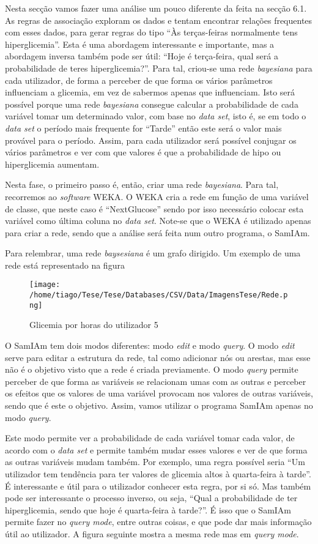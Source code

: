 Nesta secção vamos fazer uma análise um pouco diferente da feita na secção 6.1. As regras de associação exploram os dados e tentam encontrar relações frequentes com esses dados, para gerar regras do tipo ``Às terças-feiras normalmente tens hiperglicemia''. Esta é uma abordagem interessante e importante, mas a abordagem inversa também pode ser útil: ``Hoje é terça-feira, qual será a probabilidade de teres hiperglicemia?''. Para tal, criou-se uma rede \textit{bayesiana} para cada utilizador, de forma a perceber de que forma os vários parâmetros influenciam a glicemia, em vez de sabermos apenas que influenciam. Isto será possível porque uma rede \textit{bayesiana} consegue calcular a probabilidade de cada variável tomar um determinado valor, com base no \textit{data set}, isto é, se em todo o \textit{data set} o período mais frequente for ``Tarde'' então este será o valor mais provável para o período. 
Assim, para cada utilizador será possível conjugar os vários parâmetros e ver com que valores é que a probabilidade de hipo ou hiperglicemia aumentam.

Nesta fase, o primeiro passo é, então, criar uma rede \textit{bayesiana}. Para tal, recorremos ao \textit{software} WEKA. O WEKA cria a rede em função de uma variável de classe, que neste caso é ``Next\textunderscore Glucose'' sendo por isso necessário colocar esta variável como última coluna no \textit{data set}. Note-se que o WEKA é utilizado apenas para criar a rede, sendo que a análise será feita num outro programa, o SamIAm.

Para relembrar, uma rede \textit{baysesiana} é um grafo dirigido. Um exemplo de uma rede está representado na figura
\begin{figure}[H]
\centering
\texttt{[image: /home/tiago/Tese/Tese/Databases/CSV/Data/ImagensTese/Rede.png]}
\caption{Glicemia por horas do utilizador 5}
\end{figure}

O SamIAm tem dois modos diferentes: modo \textit{edit} e modo \textit{query}. O modo \textit{edit} serve para editar a estrutura da rede, tal como adicionar nós ou arestas, mas esse não é o objetivo visto que a rede é criada previamente. O modo \textit{query} permite perceber de que forma as variáveis se relacionam umas com as outras e perceber os efeitos que os valores de uma variável provocam nos valores de outras variáveis, sendo que é este o objetivo. Assim, vamos utilizar o programa SamIAm apenas no modo \textit{query}.

Este modo permite ver a probabilidade de cada variável tomar cada valor, de acordo com o \textit{data set} e permite também mudar esses valores e ver de que forma as outras variáveis mudam também. Por exemplo, uma regra possível seria ``Um utilizador tem tendência para ter valores de glicemia altos à quarta-feira à tarde''. É interessante e útil para o utilizador conhecer esta regra, por si só. Mas também pode ser interessante o processo inverso, ou seja, ``Qual a probabilidade de ter hiperglicemia, sendo que hoje é quarta-feira à tarde?''. É isso que o SamIAm permite fazer no \textit{query mode}, entre outras coisas, e que pode dar mais informação útil ao utilizador. A figura seguinte mostra a mesma rede mas em \textit{query mode}.

